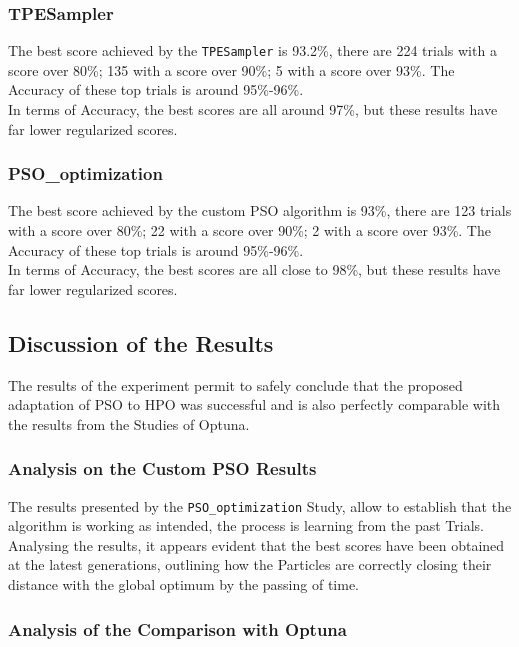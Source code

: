 \subsubsection{TPESampler}

The best score achieved by the \texttt{TPESampler} is 93.2\%, there are 224 trials with a score over 80\%; 135 with a score over 90\%; 5 with a score over 93\%. The Accuracy of these top trials is around 95\%-96\%.
\\[0.3cm]In terms of Accuracy, the best scores are all around 97\%, but these results have far lower regularized scores.

\subsubsection{PSO\_optimization}

The best score achieved by the custom PSO algorithm is 93\%, there are 123 trials with a score over 80\%; 22 with a score over 90\%; 2 with a score over 93\%. The Accuracy of these top trials is around 95\%-96\%.
\\[0.3cm]In terms of Accuracy, the best scores are all close to 98\%, but these results have far lower regularized scores.

\subsection{Discussion of the Results}

The results of the experiment permit to safely conclude that the proposed adaptation of PSO to HPO was successful and is also perfectly comparable with the results from the Studies of Optuna.

\subsubsection{Analysis on the Custom PSO Results}

The results presented by the \texttt{PSO\_optimization} Study, allow to establish that the algorithm is working as intended, the process is learning from the past Trials.
Analysing the results, it appears evident that the best scores have been obtained at the latest generations, outlining how the Particles are correctly closing their distance with the global optimum by the passing of time.

\subsubsection{Analysis of the Comparison with Optuna}

